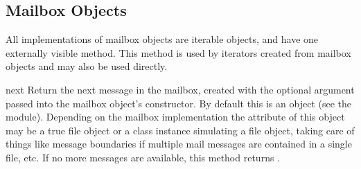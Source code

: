 \subsection{Mailbox Objects \label{mailbox-objects}}

All implementations of mailbox objects are iterable objects, and
have one externally visible method.  This method is used by iterators
created from mailbox objects and may also be used directly.

\begin{methoddesc}[mailbox]{next}{}
Return the next message in the mailbox, created with the optional
 argument passed into the mailbox object's constructor.
By default this is an 
object (see the  module).  Depending on the mailbox
implementation the  attribute of this object may be a true
file object or a class instance simulating a file object, taking care
of things like message boundaries if multiple mail messages are
contained in a single file, etc.  If no more messages are available,
this method returns .
\end{methoddesc}
